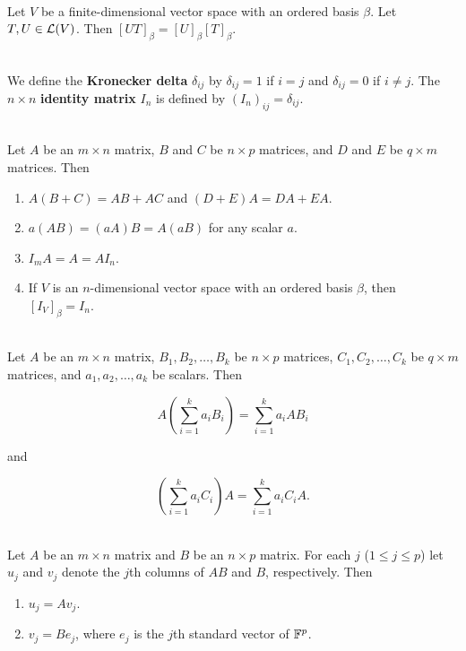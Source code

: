 \begin{corollary}
	\hfill\\
	Let $V$ be a finite-dimensional vector space with an ordered basis $\beta$. Let $T, U \in \mathcal{L}(V)$. Then $[UT]_\beta = [U]_\beta [T]_\beta$.
\end{corollary}

\begin{definition}
	\hfill\\
	We define the \textbf{Kronecker delta} $\delta_{ij}$ by $\delta_{ij}=1$ if $i = j$ and $\delta_{ij}=0$ if $i \neq j$. The $n \times n$ \textbf{identity matrix} $I_n$ is defined by $(I_n)_{ij} = \delta_{ij}$.
\end{definition}

\begin{theorem}
	\hfill\\
	Let $A$ be an $m \times n$ matrix, $B$ and $C$ be $n \times p$ matrices, and $D$ and $E$ be $q \times m$ matrices. Then

	\begin{enumerate}
		\item $A(B + C) = AB + AC$ and $(D + E)A = DA + EA$.
		\item $a(AB) = (aA)B = A(aB)$ for any scalar $a$.
		\item $I_mA = A = AI_n$.
		\item If $V$ is an $n$-dimensional vector space with an ordered basis $\beta$, then $[I_V]_\beta = I_n$.
	\end{enumerate}
\end{theorem}

\begin{corollary}
	\hfill\\
	Let $A$ be an $m \times n$ matrix, $B_1, B_2, \dots, B_k$ be $n \times p$ matrices, $C_1, C_2, \dots, C_k$ be $q \times m$ matrices, and $a_1, a_2, \dots, a_k$ be scalars. Then

	\[A\left(\sum_{i=1}^{k}a_iB_i\right) = \sum_{i=1}^{k}a_iAB_i\]

	and

	\[\left(\sum_{i=1}^{k}a_iC_i\right)A = \sum_{i=1}^{k}a_iC_iA.\]
\end{corollary}

\begin{theorem}
	\hfill\\
	Let $A$ be an $m \times n$ matrix and $B$ be an $n \times p$ matrix. For each $j$ ($1 \leq j \leq p$) let $u_j$ and $v_j$ denote the $j$th columns of $AB$ and $B$, respectively. Then

	\begin{enumerate}
		\item $u_j = Av_j$.
		\item $v_j = Be_j$, where $e_j$ is the $j$th standard vector of $\mathbb{F}^p$.
	\end{enumerate}
\end{theorem}

